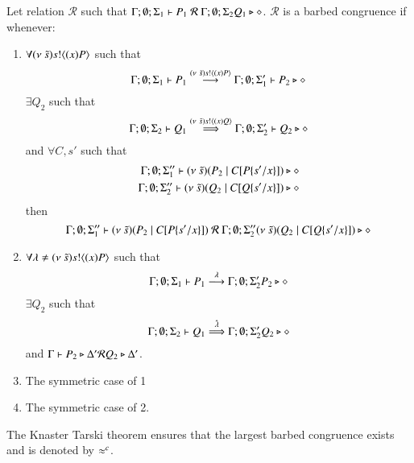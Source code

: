 \begin{definition}\rm
	Let relation $\mathcal{R}$ such that $\Gamma; \emptyset; \Sigma_1 \vdash P_1\ \mathcal{R}\ \Gamma; \emptyset; \Sigma_2 Q_1 \triangleright \diamond$.
	$\mathcal{R}$ is a barbed congruence if whenever:
	\begin{enumerate}
		\item	$\forall (\nu\ \tilde{s}) s ! \langle (x)P \rangle$ such that
			\[
				\Gamma; \emptyset; \Sigma_1 \vdash P_1 \stackrel{(\nu\ \tilde{s}) s ! \langle (x)P \rangle}{\longrightarrow} \Gamma; \emptyset; \Sigma_1' \vdash P_2 \triangleright \diamond
			\]
			$\exists Q_2$ such that
			\[
				\Gamma; \emptyset; \Sigma_2 \vdash Q_1 \stackrel{(\nu\ \tilde{s}) s ! \langle (x)Q \rangle}{\Longrightarrow} \Gamma; \emptyset; \Sigma_2' \vdash Q_2 \triangleright \diamond
			\]
			and $\forall C, s'$ such that
			\begin{eqnarray*}
				\Gamma; \emptyset; \Sigma_1'' \vdash (\nu\ \tilde{s})(P_2 \;|\; C[P \{s'/x \}]) \triangleright \diamond \\
				\Gamma; \emptyset; \Sigma_2'' \vdash (\nu\ \tilde{s})(Q_2 \;|\; C[Q \{s'/x \}]) \triangleright \diamond
			\end{eqnarray*}
			then
			\[
				\Gamma; \emptyset; \Sigma_1'' \proves \newsp{\tilde{s}}{P_2 \Par \context{C}{P \subst{s'}{x}}}\ \mathcal{R}\ 
				\Gamma; \emptyset; \Sigma_2'' \newsp{\tilde{s}}{Q_2 \Par \context{C}{Q \subst{s'}{x}}} \hastype \Proc
			\]

		\item	$\forall \lambda \not= (\nu\ \tilde{s}) s ! \langle (x)P \rangle$ such that
			\[
				\Gamma; \emptyset; \Sigma_1 \vdash P_1 \stackrel{\lambda}{\longrightarrow} \Gamma; \emptyset; \Sigma_2' P_2 \triangleright \diamond
			\]
			$\exists Q_2$ such that 
			\[
				\Gamma; \emptyset; \Sigma_2 \vdash Q_1 \stackrel{\hat{\lambda}}{\Longrightarrow} \Gamma; \emptyset; \Sigma_2' Q_2 \triangleright \diamond
			\]
			and
			$\Gamma \vdash P_2 \triangleright \Delta' \mathcal{R} Q_2 \triangleright \Delta'$.

		\item	The symmetric case of 1 
		\item	The symmetric case of 2.
	\end{enumerate}
	The Knaster Tarski theorem ensures that the largest barbed congruence exists and is denoted by $\approx^c$.
\end{definition}


